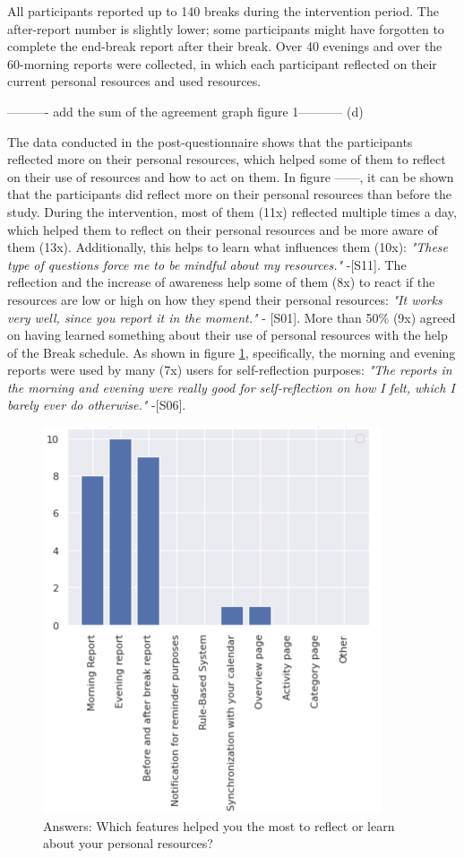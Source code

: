 \documentclass{hasel_thesis}
\begin{document}
All participants reported up to 140 breaks during the intervention period. The after-report number is slightly lower; some participants might have forgotten to complete the end-break report after their break. Over 40 evenings and over the 60-morning reports were collected, in which each participant reflected on their current personal resources and used resources.  

---------- add the sum of the agreement graph figure 1----------- (d)

The data conducted in the post-questionnaire shows that the participants reflected more on their personal resources, which helped some of them to reflect on their use of resources and how to act on them.  In figure ------, it can be shown that the participants did reflect more on their personal resources than before the study.  During the intervention, most of them (11x) reflected multiple times a day, which helped them to reflect on their personal resources and be more aware of them (13x). Additionally, this helps to learn what influences them (10x): \textit{"These type of questions force me to be mindful about my resources." }-[S11]. The reflection and the increase of awareness help some of them (8x) to react if the resources are low or high on how they spend their personal resources: \textit{"It works very well, since you report it in the moment."} - [S01]. More than 50\% (9x) agreed on having learned something about their use of personal resources with the help of the Break schedule. As shown in figure \ref{fig:feature_ratings_reflecting}, specifically, the morning and evening reports were used by many (7x) users for self-reflection purposes: \textit{"The reports in the morning and evening were really good for self-reflection on how I felt, which I barely ever do otherwise."} -[S06]. 

\begin{figure}[htp]
    \centering
    \includegraphics[width=10cm]{hasel_thesis/images/feature_rating_reflecting.png}
    \caption{Answers: Which features helped you the most to reflect or learn about your personal resources?}
    \label{fig:feature_ratings_reflecting}
\end{figure}
\end{document}
